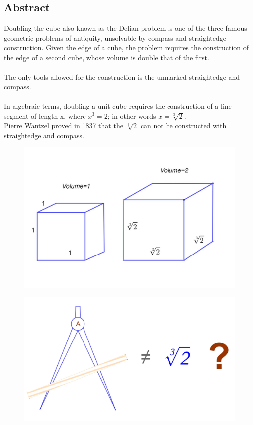 \documentclass[12pt, letterpaper, oneside]{report}
\begin{document}
\begin{center}
\section*{Abstract}
\end{center}
Doubling the cube also known as the Delian problem is one of the three famous geometric problems of antiquity, unsolvable by compass and straightedge construction. Given the edge of a cube, the problem requires the construction of the edge of a second cube, whose volume is double that of the first.\\
\\
The only tools allowed for the construction is the unmarked straightedge and compass.\\
\\
In algebraic terms, doubling a unit cube requires the construction of a line segment of length x, where $x^{3} = 2$; in other words $x =\sqrt[3]{2}$.\\
Pierre Wantzel proved in 1837 that the $\sqrt[3]{2}$ can not be constructed with straightedge and compass.\cite{A} \\ 
\begin{figure}[h]
	\centering
	\includegraphics[width=0.7\linewidth]{images/cubes.jpg}
	\label{fig:cubes}
\end{figure}
\begin{figure}[h]
	\centering
	\includegraphics[width=0.8\linewidth]{images/compass.jpg}
	\label{fig:compass}
\end{figure}
\newpage
\end{document}

